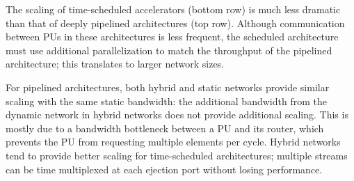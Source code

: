 The scaling of time-scheduled accelerators (bottom row) is much less dramatic than that of deeply pipelined architectures (top row). 
Although communication between PUs in these architectures is less frequent, the scheduled architecture must use additional parallelization to match the throughput of the pipelined architecture; this translates to larger network sizes. 

For pipelined architectures, both hybrid and static networks provide similar scaling with the same static bandwidth:
the additional bandwidth from the dynamic network in hybrid networks does not provide additional scaling. 
This is mostly due to a bandwidth bottleneck between a PU and its router, which prevents the PU from requesting multiple elements per cycle.
Hybrid networks tend to provide better scaling for time-scheduled architectures; multiple streams can be time multiplexed at each ejection port without losing performance.

